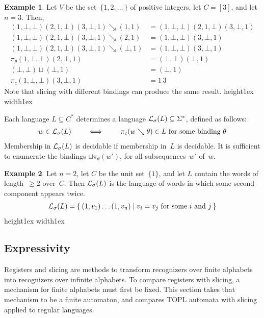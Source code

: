 \documentclass{article} %
\newcommand{\eoe}{\hskip5mm\null\nobreak\hfill\vrule height1ex width1ex}
\theoremstyle{definition}
\newtheorem{example}{Example}
\theoremstyle{remark}
\begin{document}
\begin{example}\label{ex:slicing}
Let $V$ be the set~$\{1,2,\ldots\,\}$ of positive integers, let $C=[3]$, and let $n=3$.
Then,
\begin{align*}
(1,\bot,\bot)(2,1,\bot)(3,\bot,1)\searrow(1,1)
  &= (1,\bot,\bot)(2,1,\bot)(3,\bot,1) \\
(1,\bot,\bot)(2,1,\bot)(3,\bot,1)\searrow(2,1)
  &= (1,\bot,\bot)(3,\bot,1) \\
(1,\bot,\bot)(2,1,\bot)(3,\bot,1)\searrow(\bot,1)
  &= (1,\bot,\bot)(3,\bot,1) \\
\pi_\theta(1,\bot,\bot)(2,\bot,1) &= (\bot,\bot)(\bot,1) \\
(\bot,\bot)\sqcup(\bot,1) &= (\bot,1) \\
\pi_c(1,\bot,\bot)(3,\bot,1) &= 1\,3
\end{align*}
Note that slicing with different bindings can produce the same result.
\eoe
\end{example}

Each language $L \subseteq C^*$ determines a language ${\cal L}_\sigma(L) \subseteq \Sigma^*$, defined as follows:
\begin{align*}
w \in {\cal L}_\sigma(L)
  \qquad\iff\qquad
\text{$\pi_c(w\searrow\theta)\in L$ for some binding~$\theta$}
\end{align*}
Membership in ${\cal L}_\sigma(L)$ is decidable if membership in~$L$ is decidable.
It is sufficient to enumerate the bindings $\sqcup\pi_\theta(w')$, for all subsequences~$w'$ of~$w$.

\begin{example}\label{ex:slicing_lang}
Let $n=2$, let $C$ be the unit set~$\{1\}$, and let $L$ contain the words of length~$\ge2$ over~$C$.
Then ${\cal L}_\sigma(L)$ is the language of words in which some second component appears twice.
\begin{align*}
{\cal L}_\sigma(L) = \{\,(1,v_1)\ldots(1,v_n)\mid\text{$v_i=v_j$ for some $i$ and $j$}\,\}
\end{align*}
\eoe
\end{example}

\subsection{Expressivity}

Registers and slicing are methods to transform recognizers over finite alphabets into recognizers over infinite alphabets.
To compare registers with slicing, a mechanism for finite alphabets must first be fixed.
This section takes that mechanism to be a finite automaton, and compares TOPL automata with slicing applied to regular languages.
\end{document}
